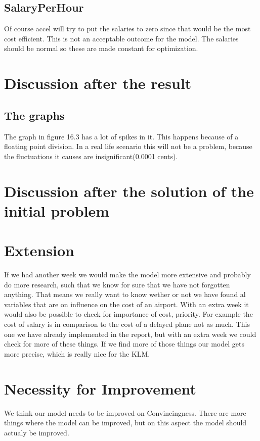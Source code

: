 \documentclass[a4paper, 11pt, notitlepage]{report}
\begin{document}
	\section{SalaryPerHour}
Of course accel will try to put the salaries to zero since that would be the most cost efficient. This is not an acceptable outcome for the model. The salaries should be normal so these are made constant for optimization.

\chapter{Discussion after the result}

	\section{The graphs}
	The graph in figure 16.3 has a lot of spikes in it. This happens because of a floating point division. In a real life scenario this will not be a problem, because the fluctuations it causes are insignificant(0.0001 cents).
	
\chapter{Discussion after the solution of the initial problem}

\chapter{Extension}
If we had another week we would make the model more extensive and probably do more research, such that we know for sure that we have not forgotten anything. That means we really want to know wether or not we have found al variables that are on influence on the cost of an airport. With an extra week it would also be possible to check for importance of cost, priority. For example the cost of  salary is in comparison to the cost of a delayed plane not as much. This one we have already implemented in the report, but with an extra week we could check for more of these things. If we find more of those things our model gets more precise, which is really nice for the KLM.

\chapter{Necessity for Improvement}
We think our model needs to be improved on Convincingness. There are more things where the model can be improved, but on this aspect the model should actualy be improved.
\end{document}
